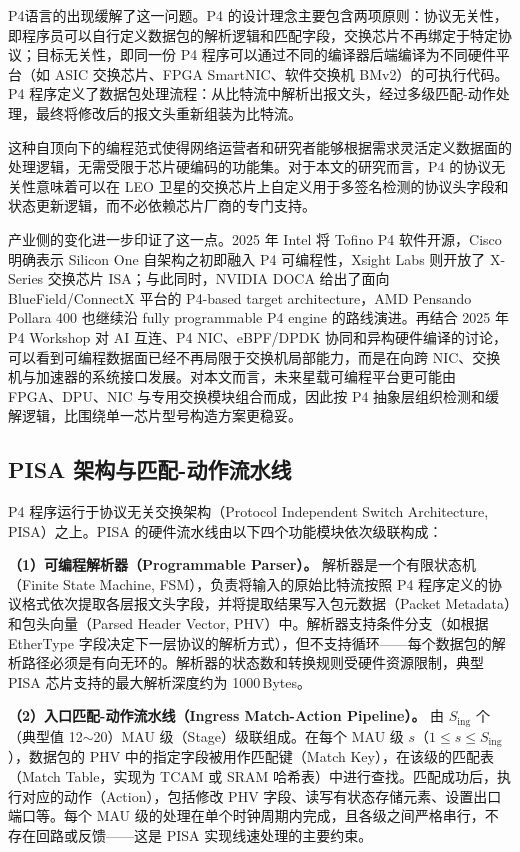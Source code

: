 P4语言的出现缓解了这一问题。P4 的设计理念主要包含两项原则：协议无关性，即程序员可以自行定义数据包的解析逻辑和匹配字段，交换芯片不再绑定于特定协议；目标无关性，即同一份 P4 程序可以通过不同的编译器后端编译为不同硬件平台（如 ASIC 交换芯片、FPGA SmartNIC、软件交换机 BMv2）的可执行代码。P4 程序定义了数据包处理流程：从比特流中解析出报文头，经过多级匹配-动作处理，最终将修改后的报文头重新组装为比特流。

这种自顶向下的编程范式使得网络运营者和研究者能够根据需求灵活定义数据面的处理逻辑，无需受限于芯片硬编码的功能集。对于本文的研究而言，P4 的协议无关性意味着可以在 LEO 卫星的交换芯片上自定义用于多签名检测的协议头字段和状态更新逻辑，而不必依赖芯片厂商的专门支持。


产业侧的变化进一步印证了这一点。2025 年 Intel 将 Tofino P4 软件开源，Cisco 明确表示 Silicon One 自架构之初即融入 P4 可编程性，Xsight Labs 则开放了 X-Series 交换芯片 ISA；与此同时，NVIDIA DOCA 给出了面向 BlueField/ConnectX 平台的 P4-based target architecture，AMD Pensando Pollara 400 也继续沿 fully programmable P4 engine 的路线演进。再结合 2025 年 P4 Workshop 对 AI 互连、P4 NIC、eBPF/DPDK 协同和异构硬件编译的讨论，可以看到可编程数据面已经不再局限于交换机局部能力，而是在向跨 NIC、交换机与加速器的系统接口发展。对本文而言，未来星载可编程平台更可能由 FPGA、DPU、NIC 与专用交换模块组合而成，因此按 P4 抽象层组织检测和缓解逻辑，比围绕单一芯片型号构造方案更稳妥。

\subsection{PISA 架构与匹配-动作流水线}

P4 程序运行于协议无关交换架构（Protocol Independent Switch Architecture, PISA）之上。PISA 的硬件流水线由以下四个功能模块依次级联构成：

\textbf{（1）可编程解析器（Programmable Parser）。} 解析器是一个有限状态机（Finite State Machine, FSM），负责将输入的原始比特流按照 P4 程序定义的协议格式依次提取各层报文头字段，并将提取结果写入包元数据（Packet Metadata）和包头向量（Parsed Header Vector, PHV）中。解析器支持条件分支（如根据 EtherType 字段决定下一层协议的解析方式），但不支持循环——每个数据包的解析路径必须是有向无环的。解析器的状态数和转换规则受硬件资源限制，典型 PISA 芯片支持的最大解析深度约为 1000\,Bytes。

\textbf{（2）入口匹配-动作流水线（Ingress Match-Action Pipeline）。} 由 $S_{\text{ing}}$ 个（典型值 12$\sim$20）MAU 级（Stage）级联组成。在每个 MAU 级 $s$（$1 \leq s \leq S_{\text{ing}}$），数据包的 PHV 中的指定字段被用作匹配键（Match Key），在该级的匹配表（Match Table，实现为 TCAM 或 SRAM 哈希表）中进行查找。匹配成功后，执行对应的动作（Action），包括修改 PHV 字段、读写有状态存储元素、设置出口端口等。每个 MAU 级的处理在单个时钟周期内完成，且各级之间严格串行，不存在回路或反馈——这是 PISA 实现线速处理的主要约束。

